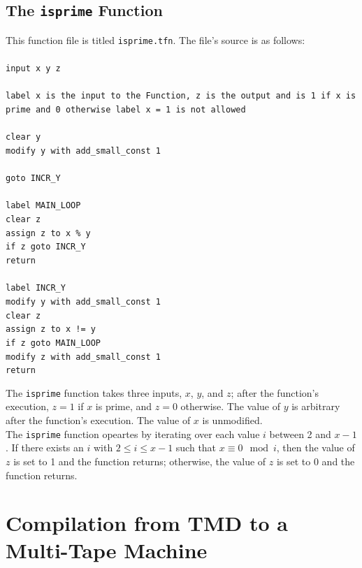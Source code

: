\documentclass[11pt]{report}
\begin{document}
\subsection{The \texttt{isprime} Function \label{sec:functionfilegoldbach}}

This function file is titled \texttt{isprime.tfn}. The file's source is as follows: \\ \\
{\tt input x y z \\ \\
label x is the input to the Function, z is the output and is 1 if x is prime and 0 otherwise
label x = 1 is not allowed \\ \\
clear y \\
modify y with add\_small\_const 1 \\ \\ 
goto INCR\_Y \\ \\
label MAIN\_LOOP \\
clear z \\
assign z to x \% y \\
if z goto INCR\_Y \\
return \\ \\
label INCR\_Y \\
modify y with add\_small\_const 1 \\
clear z \\
assign z to x != y \\
if z goto MAIN\_LOOP \\
modify z with add\_small\_const 1 \\
return \\ }

The \texttt{isprime} function takes three inputs, $x$, $y$, and $z$; after the function's execution, $z = 1$ if $x$ is prime, and $z = 0$ otherwise. The value of $y$ is arbitrary after the function's execution. The value of $x$ is unmodified. \\

The \texttt{isprime} function opeartes by iterating over each value $i$ between 2 and $x-1$. If there exists an $i$ with $2 \le i \le x-1$ such that $x \equiv 0 \mod i$, then the value of $z$ is set to 1 and the function returns; otherwise, the value of $z$ is set to 0 and the function returns. \\

\section{Compilation from TMD to a Multi-Tape Machine \label{sec:turdtotmgoldbach}}
\end{document}

